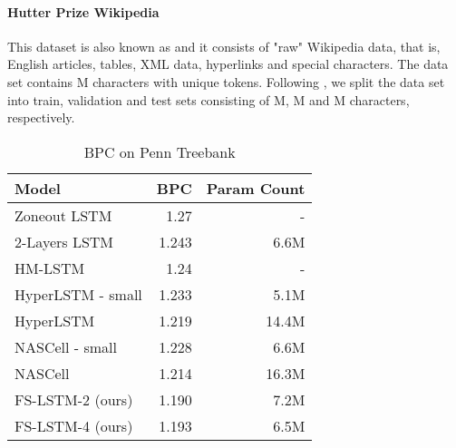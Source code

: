 \documentclass{article}
\begin{document}
\paragraph{Hutter Prize Wikipedia \cite{hutter2012enwik8}}  This dataset is also known as  and it consists of "raw" Wikipedia data, that is, English articles, tables, XML data, hyperlinks and special characters. The data set contains M characters with  unique tokens. 
Following \cite{chung2015gated}, we split the data set into train, validation and test sets consisting of M, M and M characters, respectively.































\begin{table}
\caption{BPC  on Penn Treebank}
\label{table: ptb}
\renewcommand{\arraystretch}{1.1}
\begin{center}
 \begin{tabular}{@{}l r r@{}}
\toprule[1.5pt]
Model & BPC & Param Count \\ 
\midrule
Zoneout LSTM \cite{krueger16zoneout}& 1.27 & -\\
2-Layers LSTM & 1.243 & 6.6M\\
 HM-LSTM \cite{chung2016multiscale}& 1.24 & - \\
 HyperLSTM - small \cite{ha2016hyper}& 1.233 & 5.1M \\
 HyperLSTM \cite{ha2016hyper} & 1.219 & 14.4M \\  
 NASCell - small \cite{zoph2016NASCell} & 1.228 & 6.6M \\
 NASCell \cite{zoph2016NASCell} & 1.214 & 16.3M \\
 \midrule
 FS-LSTM-2 (ours) & 1.190 & 7.2M \\ 
 FS-LSTM-4 (ours) & 1.193 & 6.5M \\
 \bottomrule[1.5pt]
\end{tabular}
\end{center}
\end{table}
\end{document}

